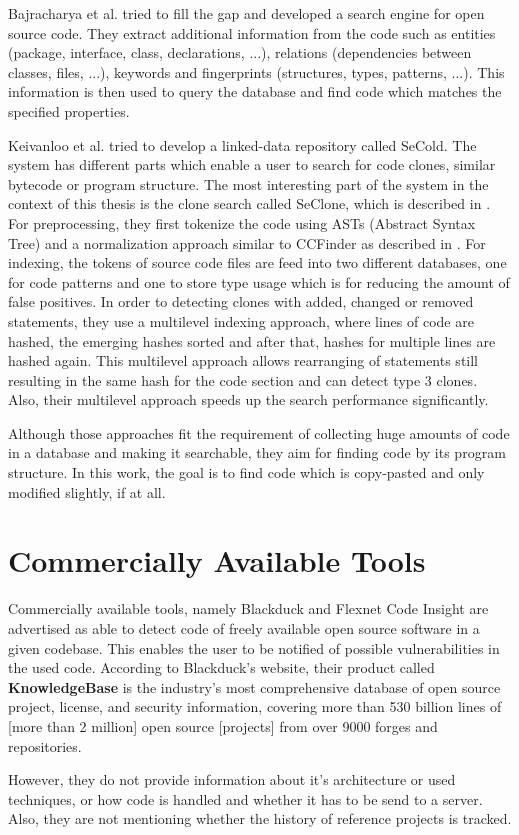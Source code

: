 Bajracharya et al. tried to fill the gap and developed a search engine for open source code.
They extract additional information from the code such as entities (package, interface, class, declarations, ...), relations (dependencies between classes, files, ...), keywords and fingerprints (structures, types, patterns, ...).
This information is then used to query the database and find code which matches the specified properties.

Keivanloo et al. \cite{keivanloo2012leveraging,keivanloo2011internet,keivanloo2011seclone,keivanloo2010semantic} tried to develop a linked-data repository called SeCold.
The system has different parts which enable a user to search for code clones, similar bytecode or program structure.
The most interesting part of the system in the context of this thesis is the clone search called SeClone, which is described in \cite{keivanloo2011internet,keivanloo2011seclone}.
For preprocessing, they first tokenize the code using ASTs (Abstract Syntax Tree) and a normalization approach similar to CCFinder as described in \cite{kamiya2002ccfinder}.
For indexing, the tokens of source code files are feed into two different databases, one for code patterns and one to store type usage which is for reducing the amount of false positives.
In order to detecting clones with added, changed or removed statements, they use a multilevel indexing approach, where lines of code are hashed, the emerging hashes sorted and after that, hashes for multiple lines are hashed again.
This multilevel approach allows rearranging of statements still resulting in the same hash for the code section and can detect type 3 clones.
Also, their multilevel approach speeds up the search performance significantly.

Although those approaches fit the requirement of collecting huge amounts of code in a database and making it searchable, they aim for finding code by its program structure.
In this work, the goal is to find code which is copy-pasted and only modified slightly, if at all.

\section{Commercially Available Tools}
Commercially available tools, namely Blackduck and Flexnet Code Insight are advertised as able to detect code of freely available open source software in a given codebase.
This enables the user to be notified of possible vulnerabilities in the used code.
According to Blackduck's website, their product called \textbf{KnowledgeBase} \glqq is the industry’s most comprehensive database of open source project, license, and security information, covering more than 530 billion lines of [more than 2 million] open source [projects] from over 9000 forges and repositories\grqq \cite{blackduck}.

However, they do not provide information about it's architecture or used techniques, or how code is handled and whether it has to be send to a server.
Also, they are not mentioning whether the history of reference projects is tracked.
